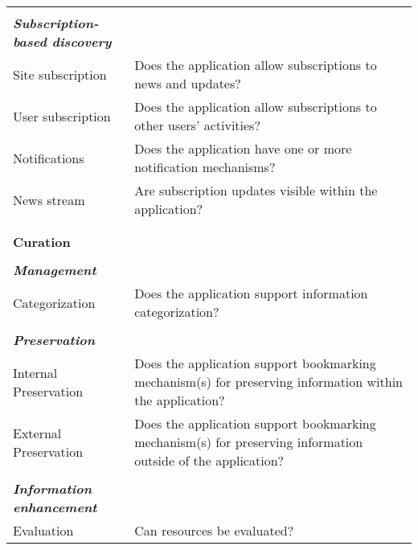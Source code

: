 \documentclass{casconpaper}
\begin{document}
{\begin{table*}[htbp]
\begin{tabular}{|p{0.30\linewidth}|p{0.70\linewidth}|}
&\\
\emph{\textbf{Subscription-based discovery}}          &                                                                                                           \\
Site subscription            & Does the application allow subscriptions to news and updates?                                             \\
User subscription             & Does the application allow subscriptions to other users' activities?                                      \\
Notifications                & Does the application have one or more notification mechanisms?                                                      \\
News stream                  & Are subscription updates visible within the application?  \\
&\\
\hline     
&\\                                        
\textbf{\large{Curation}}                     &                                                                                                        \\
&\\        
\emph{\textbf{Management}}                    &                                                                                                           \\
Categorization               & Does the application support information categorization?                                                  \\
&\\
\emph{\textbf{Preservation}}                   &                                                                                                           \\
Internal Preservation        & Does the application support bookmarking mechanism(s) for preserving information within the application?        \\
External Preservation        & Does the application support bookmarking mechanism(s) for preserving information outside of the application? \\
&\\
\emph{\textbf{Information enhancement}}            &                                                                                                           \\
Evaluation                   & Can resources be evaluated?                                                                               \\

\end{tabular}
\end{table*}}
\end{document}
